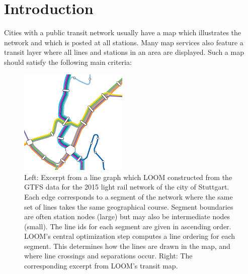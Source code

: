 \documentclass[format=acmsmall, review=false, screen=true]{acmart}
\begin{document}


\maketitle

\section{Introduction}\label{SEC:intro}
%

Cities with a public transit network usually have a map which illustrates the network and which is posted at all stations. Many map services also feature a transit layer where all lines and stations in an area are displayed.
Such a map should satisfy the following main criteria:\vspace{0pt}



\begin{figure}[t]
  \centering
  
  \hspace{0.5cm}
  \includegraphics[trim={0cm 0 2.47cm 4.07cm},clip,width=0.46\textwidth]{render_examples/vvs_cropped.pdf}
  \caption{Left: Excerpt from a line graph which LOOM constructed from the GTFS data for the 2015 light rail network of the city of Stuttgart. Each edge corresponds to a segment of the network where the same set of lines takes the same geographical course. Segment boundaries are often station nodes (large) but may also be intermediate nodes (small). The line ids for each segment are given in ascending order. LOOM's central optimization step computes a line ordering for each segment. This determines how the lines are drawn in the map, and where line crossings and separations occur. Right: The corresponding excerpt from LOOM's transit map.}
  \label{FIG:transitgraphvvs}  
\end{figure}
\end{document}

